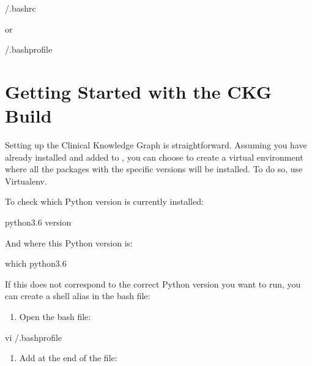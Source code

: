 \documentclass[letterpaper,10pt,english]{sphinxmanual}
\begin{document}
\begin{sphinxVerbatim}[commandchars=\\\{\}]
\PYGZdl{}  \PYGZti{}/.bashrc
\end{sphinxVerbatim}

or

\begin{sphinxVerbatim}[commandchars=\\\{\}]
\PYGZdl{}  \PYGZti{}/.bash\PYGZus{}profile
\end{sphinxVerbatim}


\section{Getting Started with the CKG Build}
\label{\detokenize{intro/getting-started-with-build:getting-started-with-the-ckg-build}}\label{\detokenize{intro/getting-started-with-build::doc}}
Setting up the Clinical Knowledge Graph is straightforward.
Assuming you have  already installed and added to , you can choose to create a virtual environment where all the packages with the specific versions will be installed. To do so, use Virtualenv.

To check which Python version is currently installed:

\begin{sphinxVerbatim}[commandchars=\\\{\}]
\PYGZdl{} python3.6 \PYGZhy{}\PYGZhy{}version
\end{sphinxVerbatim}

And where this Python version is:

\begin{sphinxVerbatim}[commandchars=\\\{\}]
\PYGZdl{} which python3.6
\end{sphinxVerbatim}

If this does not correspond to the correct Python version you want to run, you can create a shell alias in the bash file:
\begin{enumerate}
%
\item {} 
Open the bash file:

\end{enumerate}

\begin{sphinxVerbatim}[commandchars=\\\{\}]
\PYGZdl{} vi \PYGZti{}/.bash\PYGZus{}profile
\end{sphinxVerbatim}
\begin{enumerate}
%
\item {} 
Add at the end of the file:

\end{enumerate}
\end{document}
